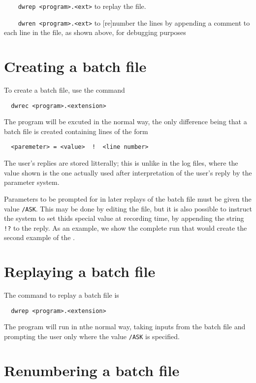 \item \verb/	dwrep <program>.<ext>/ to replay the file.
 
\item \verb/	dwren <program>.<ext>/ to [re]number the lines by appending a
		comment to each line in the file, as shown above, for debugging
		purposes
\ei


\section{ Creating a batch file }
\label{.create}

	To create a batch file, use the command

\verb/	dwrec <program>.<extension>/

The program will be excuted in the normal way, the only difference being that a batch file is created containing lines of the form

\verb/	<paremeter> = <value>  !  <line number>/

	The user's replies are stored litterally; this is unlike in the \NEWSTAR log files, where the value shown is the one actually used after interpretation of the user's reply by the parameter system. 

	Parameters to be prompted for in later replays of the batch file must be given the value \verb:/ASK:. This may be done by editing the file, but it is also possible to instruct the system to set thids special value at recording time, by appending the string \verb/!?/ to the reply. As an example, we show the complete run that would create the second example of the .

\indent {}


\section{ Replaying a batch file }
\label{.replay}

	The command to replay a batch file is

\verb/	dwrep <program>.<extension>/

The program will run in nthe normal way, taking inputs from the batch file and prompting the user only where the value \verb:/ASK: is specified.


\section{ Renumbering a batch file }
\label{.renumber}

